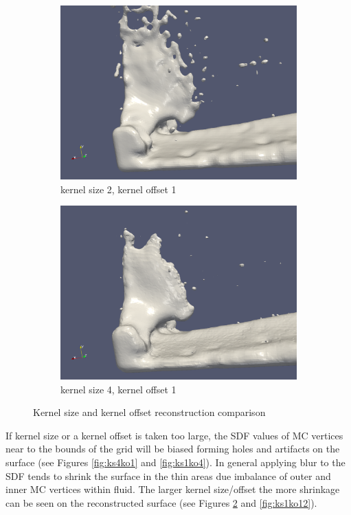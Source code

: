 \begin{figure}
\begin{subfigure}[b]{0.5\textwidth}
               \includegraphics[width=\textwidth]{figures/DBBlur_ks-2_ko-1_2.png}
               \caption{kernel size 2, kernel offset 1}
               \label{fig:ks2ko12}
        \end{subfigure}        
        \begin{subfigure}[b]{0.5\textwidth}
               \includegraphics[width=\textwidth]{figures/DBBlur_ks-4_ko-1_2.png}
               \caption{kernel size 4, kernel offset 1}
               \label{fig:ks4ko12}
        \end{subfigure}
        \caption{Kernel size and kernel offset reconstruction comparison}
        \label{fig:ksko2}
\end{figure}

If kernel size or a kernel offset is taken too large, the SDF values of MC vertices near to the bounds of the grid will be biased forming holes and artifacts on the surface (see Figures \ref{fig:ks4ko1} and \ref{fig:ks1ko4}). In general applying blur to the SDF tends to shrink the surface in the thin areas due imbalance of outer and inner MC vertices within fluid. The larger kernel size/offset the more shrinkage can be seen on the reconstructed surface (see Figures \ref{fig:ks4ko12} and \ref{fig:ks1ko12}).
